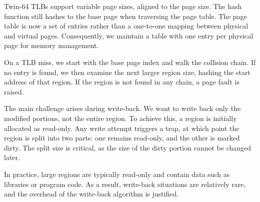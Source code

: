 
Twin-64 TLBs support variable page sizes, aligned to the page size. The hash function still hashes to the base page when traversing the page table. The page table is now a set of entries rather than a one-to-one mapping between physical and virtual pages. Consequently, we maintain a table with one entry per physical page for memory management.

On a TLB miss, we start with the base page index and walk the collision chain. If no entry is found, we then examine the next larger region size, hashing the start address of that region. If the region is not found in any chain, a page fault is raised.

The main challenge arises during write-back. We want to write back only the modified portions, not the entire region. To achieve this, a region is initially allocated as read-only. Any write attempt triggers a trap, at which point the region is split into two parts: one remains read-only, and the other is marked dirty. The split size is critical, as the size of the dirty portion cannot be changed later.

In practice, large regions are typically read-only and contain data such as libraries or program code. As a result, write-back situations are relatively rare, and the overhead of the write-back algorithm is justified. 
